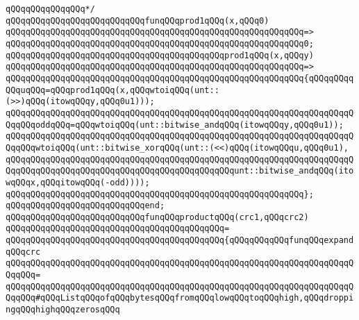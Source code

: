 \verb|qQQqqQQqqQQqqQQq*/|\newline
\newline
\verb|qQQqqQQqqQQqqQQqqQQqqQQqqQQqfunqQQqprod1qQQq(x,qQQq0)|\newline
\verb|qQQqqQQqqQQqqQQqqQQqqQQqqQQqqQQqqQQqqQQqqQQqqQQqqQQqqQQqqQQq=>|\newline
\verb|qQQqqQQqqQQqqQQqqQQqqQQqqQQqqQQqqQQqqQQqqQQqqQQqqQQqqQQqqQQq0;|\newline
\newline
\verb|qQQqqQQqqQQqqQQqqQQqqQQqqQQqqQQqqQQqqQQqqQQqprod1qQQq(x,qQQqy)|\newline
\verb|qQQqqQQqqQQqqQQqqQQqqQQqqQQqqQQqqQQqqQQqqQQqqQQqqQQqqQQqqQQq=>|\newline
\verb|qQQqqQQqqQQqqQQqqQQqqQQqqQQqqQQqqQQqqQQqqQQqqQQqqQQqqQQqqQQq{qQQqqQQqqQQquqQQq=qQQqprod1qQQq(x,qQQqwtoiqQQq(unt::(>>)qQQq(itowqQQqy,qQQq0u1)));|\newline
\verb|qQQqqQQqqQQqqQQqqQQqqQQqqQQqqQQqqQQqqQQqqQQqqQQqqQQqqQQqqQQqqQQqqQQqqQQqqQQqoddqQQq=qQQqwtoiqQQq(unt::bitwise_andqQQq(itowqQQqy,qQQq0u1));|\newline
\newline
\verb|qQQqqQQqqQQqqQQqqQQqqQQqqQQqqQQqqQQqqQQqqQQqqQQqqQQqqQQqqQQqqQQqqQQqqQQqqQQqwtoiqQQq(unt::bitwise_xorqQQq(unt::(<<)qQQq(itowqQQqu,qQQq0u1),|\newline
\verb|qQQqqQQqqQQqqQQqqQQqqQQqqQQqqQQqqQQqqQQqqQQqqQQqqQQqqQQqqQQqqQQqqQQqqQQqqQQqqQQqqQQqqQQqqQQqqQQqqQQqqQQqqQQqqQQqqQQqunt::bitwise_andqQQq(itowqQQqx,qQQqitowqQQq(-odd))));|\newline
\verb|qQQqqQQqqQQqqQQqqQQqqQQqqQQqqQQqqQQqqQQqqQQqqQQqqQQqqQQqqQQq};|\newline
\verb|qQQqqQQqqQQqqQQqqQQqqQQqqQQqend;|\newline
\newline
\verb|qQQqqQQqqQQqqQQqqQQqqQQqqQQqfunqQQqproductqQQq(crc1,qQQqcrc2)|\newline
\verb|qQQqqQQqqQQqqQQqqQQqqQQqqQQqqQQqqQQqqQQqqQQq=|\newline
\verb|qQQqqQQqqQQqqQQqqQQqqQQqqQQqqQQqqQQqqQQqqQQq{qQQqqQQqqQQqfunqQQqexpandqQQqcrc|\newline
\verb|qQQqqQQqqQQqqQQqqQQqqQQqqQQqqQQqqQQqqQQqqQQqqQQqqQQqqQQqqQQqqQQqqQQqqQQqqQQq=|\newline
\verb|qQQqqQQqqQQqqQQqqQQqqQQqqQQqqQQqqQQqqQQqqQQqqQQqqQQqqQQqqQQqqQQqqQQqqQQqqQQq#qQQqListqQQqofqQQqbytesqQQqfromqQQqlowqQQqtoqQQqhigh,qQQqdroppingqQQqhighqQQqzerosqQQq|\newline
\newline
